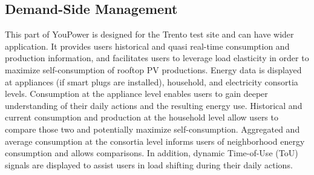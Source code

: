 %


\subsection{Demand-Side Management} 
\label{sect:load_shifting}

This part of YouPower is designed for the Trento test site and can have wider application.
It provides users historical and quasi real-time consumption and production information, and facilitates users to leverage load elasticity in order to maximize self-consumption of rooftop PV productions. 
Energy data is displayed at appliances (if smart plugs are installed), household, and electricity consortia levels. %
%
Consumption at the appliance level enables users to gain deeper understanding of their daily actions and the resulting energy use. 
% 
Historical and current consumption and production at the household level allow users to compare those two and potentially maximize self-consumption. 
% 
Aggregated and average consumption at the consortia level informs users of neighborhood energy consumption and allows comparisons.  
% 
In addition, dynamic Time-of-Use (ToU) signals are displayed  to assist users in load shifting during their daily actions. 


